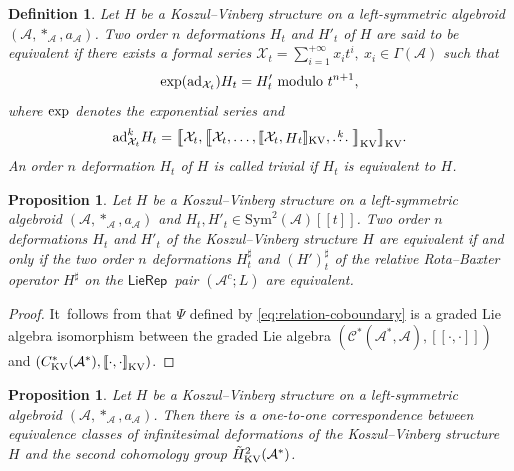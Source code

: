 \documentclass[10pt,a4paper]{amsart}
\numberwithin{equation}{section}
\newtheorem{pro}[thm]{Proposition}
\newtheorem{defi}[thm]{Definition}
\newcommand{\huaA}{\mathcal{A}}
\newcommand{\huaC}{\mathcal{C}}
\newcommand{\huaX}{\mathcal{X}}
\newcommand{\Courant}[1]{\left[\!\left[ #1\right]\!\right]}
\newcommand{\Sym}{\mathrm{Sym}}
\newcommand{\ad}{\mathrm{ad}}
\newcommand{\LP}{$\mathsf{LieRep}$~}
\begin{document}
\begin{defi}
{\sloppy
Let $H$ be a Koszul--Vinberg structure on a left-symmetric algebroid $(\huaA,\ast_\huaA,a_\huaA)$. Two order $n$ deformations $H_t$ and $H'_t$ of $H$ are said to be {\it equivalent} if there exists a formal series $\huaX_t=\sum_{i=1}^{+\infty}x_it^i,~ x_i\in \Gamma(\huaA	)$ such that
\begin{gather*}%
{\rm exp}(\ad_{\huaX_t})H_t=H'_{t} \mbox{ modulo } t^{n+1},
\end{gather*}}\noindent
where ${\rm exp}$ denotes the exponential series and\vspace{-.5ex}
\begin{gather*}
\ad^k_{\huaX_t}H_t=\big[\hspace{-3pt}\big[\huaX_t,\big[\hspace{-3pt}\big[\huaX_t,\dots,[\hspace{-1.5pt}[\huaX_t,\stackrel{}H_t]\hspace{-1.5pt}]_{\rm KV},\stackrel{k}{\dots}\big]\hspace{-3pt}\big]_{\rm KV}\big]\hspace{-3pt}\big]_{\rm KV}.
\end{gather*}
An order $n$ deformation $H_t$ of $H$ is called {\it trivial} if $H_t$ is equivalent to $H$.
\end{defi}

{\sloppy\begin{pro}\label{pro:equivalent describe}
 Let $H$ be a Koszul--Vinberg structure on a left-symmetric algebroid $(\huaA,\ast_\huaA,a_\huaA)$ and $H_t,H'_t\in\Sym^2(\huaA)[[t]]$. Two order $n$ deformations $H_t$ and $H'_t$ of the Koszul--Vinberg structure $H$ are equivalent if and only if the two order $n$ deformations $H^\sharp_t$ and $(H')^\sharp_t$ of the relative Rota--Baxter operator $H^\sharp$ on the \LP pair $(\huaA^c;L)$ are equivalent.
\end{pro}}

\begin{proof}
It~follows from that $\Psi$ defined by \eqref{eq:relation-coboundary} is a graded Lie algebra isomorphism between the graded Lie algebra $(\huaC^*(\huaA^*,\huaA),\Courant{\cdot,\cdot})$ and $(C_{\rm KV}^{*}(\huaA^*),\Courant{\cdot,\cdot}_{\rm KV})$.
\end{proof}


{\sloppy\begin{pro}
Let $H$ be a Koszul--Vinberg structure on a left-symmetric algebroid $(\huaA,\ast_\huaA,a_\huaA)$. Then there is a one-to-one correspondence between equivalence classes of infinitesimal deformations of the Koszul--Vinberg structure $H$ and the second cohomology group $\tilde{H}_{\rm KV}^2(\huaA^*)$.
\end{pro}}
\end{document}
